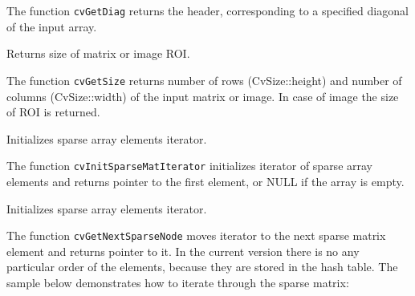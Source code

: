 The function \texttt{cvGetDiag} returns the header, corresponding to a specified diagonal of the input array.

\label{GetSize}

Returns size of matrix or image ROI.


\begin{description}
\end{description}

The function \texttt{cvGetSize} returns number of rows (CvSize::height) and number of columns (CvSize::width) of the input matrix or image. In case of image the size of ROI is returned.


\label{InitSparseMatIterator}

Initializes sparse array elements iterator.


\begin{description}
\end{description}

The function \texttt{cvInitSparseMatIterator} initializes iterator of
sparse array elements and returns pointer to the first element, or NULL
if the array is empty.

\label{GetNextSparseNode}

Initializes sparse array elements iterator.


\begin{description}
\end{description}


The function \texttt{cvGetNextSparseNode} moves iterator to the next sparse matrix element and returns pointer to it. In the current version there is no any particular order of the elements, because they are stored in the hash table. The sample below demonstrates how to iterate through the sparse matrix:

